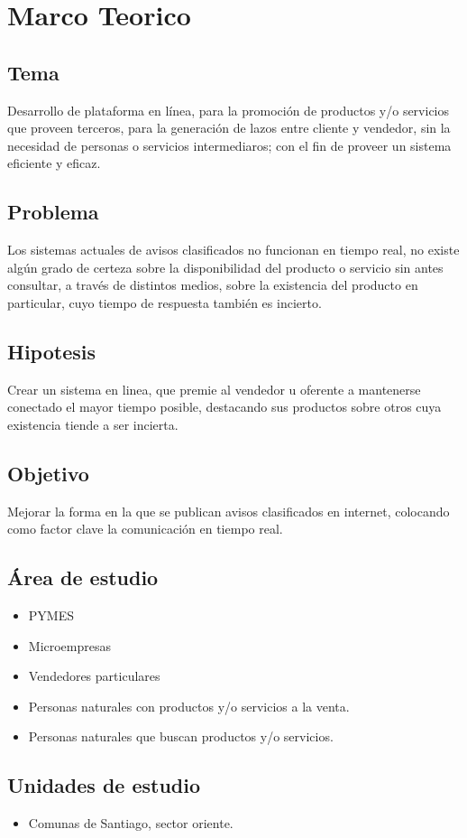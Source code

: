 \documentclass[letterpaper,openright,10pt,twoside]{report}
\begin{document}
	\chapter{Marco Teorico}
		\section{Tema}
			Desarrollo de plataforma en línea, para la promoción de productos y/o servicios que proveen terceros, para la generación de lazos entre cliente y vendedor, sin la necesidad de personas o servicios intermediaros; con el fin de proveer un sistema eficiente y eficaz.
		\section{Problema}
			Los sistemas actuales de avisos clasificados no funcionan en tiempo real, no existe algún grado de certeza sobre la disponibilidad del producto o servicio sin antes consultar, a través de distintos medios, sobre la existencia del producto en particular, cuyo tiempo de respuesta también es incierto.
		\section{Hipotesis}
			Crear un sistema en linea, que premie al vendedor u oferente a mantenerse conectado el mayor tiempo posible, destacando sus productos sobre otros cuya existencia tiende a ser incierta.
		\section{Objetivo}
			Mejorar la forma en la que se publican avisos clasificados en internet, colocando como factor clave la comunicación en tiempo real.
		\section{Área de estudio}
			\begin{itemize}
				\item PYMES
				\item Microempresas
				\item Vendedores particulares
				\item Personas naturales con productos y/o servicios a la venta.
				\item Personas naturales que buscan productos y/o servicios.
			\end{itemize}		
		\section{Unidades de estudio}
			\begin{itemize}
				\item Comunas de Santiago, sector oriente.
			\end{itemize}
\end{document}
